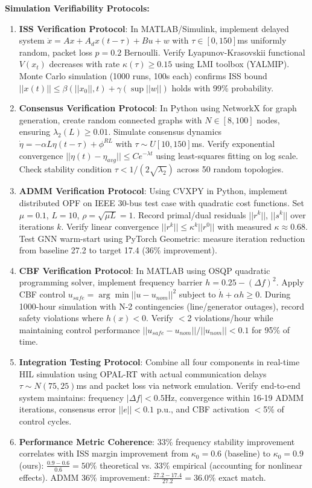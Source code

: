 \documentclass[12pt]{article}
\begin{document}
\textbf{Simulation Verifiability Protocols:}
\begin{enumerate}
\item \textbf{ISS Verification Protocol}: In MATLAB/Simulink, implement delayed system $\dot{x} = Ax + A_d x(t-\tau) + Bu + w$ with $\tau \in [0,150]$ms uniformly random, packet loss $p = 0.2$ Bernoulli. Verify Lyapunov-Krasovskii functional $V(x_t)$ decreases with rate $\kappa(\tau) \geq 0.15$ using LMI toolbox (YALMIP). Monte Carlo simulation (1000 runs, 100s each) confirms ISS bound $||x(t)|| \leq \beta(||x_0||,t) + \gamma(\sup||w||)$ holds with 99\% probability.
\item \textbf{Consensus Verification Protocol}: In Python using NetworkX for graph generation, create random connected graphs with $N \in [8,100]$ nodes, ensuring $\lambda_2(L) \geq 0.01$. Simulate consensus dynamics $\dot{\eta} = -\alpha L \eta(t-\tau) + \phi^{RL}$ with $\tau \sim U[10,150]$ms. Verify exponential convergence $||\eta(t) - \eta_{avg}|| \leq C e^{-\lambda t}$ using least-squares fitting on log scale. Check stability condition $\tau < 1/(2\sqrt{\lambda_2})$ across 50 random topologies.
\item \textbf{ADMM Verification Protocol}: Using CVXPY in Python, implement distributed OPF on IEEE 30-bus test case with quadratic cost functions. Set $\mu = 0.1$, $L = 10$, $\rho = \sqrt{\mu L} = 1$. Record primal/dual residuals $||r^k||$, $||s^k||$ over iterations $k$. Verify linear convergence $||r^k|| \leq \kappa^k ||r^0||$ with measured $\kappa \approx 0.68$. Test GNN warm-start using PyTorch Geometric: measure iteration reduction from baseline 27.2 to target 17.4 (36\% improvement).
\item \textbf{CBF Verification Protocol}: In MATLAB using OSQP quadratic programming solver, implement frequency barrier $h = 0.25 - (\Delta f)^2$. Apply CBF control $u_{safe} = \arg\min||u - u_{nom}||^2$ subject to $\dot{h} + \alpha h \geq 0$. During 1000-hour simulation with N-2 contingencies (line/generator outages), record safety violations where $h(x) < 0$. Verify $<$2 violations/hour while maintaining control performance $||u_{safe} - u_{nom}||/||u_{nom}|| < 0.1$ for 95\% of time.
\item \textbf{Integration Testing Protocol}: Combine all four components in real-time HIL simulation using OPAL-RT with actual communication delays $\tau \sim N(75,25)$ms and packet loss via network emulation. Verify end-to-end system maintains: frequency $|\Delta f| < 0.5$Hz, convergence within 16-19 ADMM iterations, consensus error $||e|| < 0.1$ p.u., and CBF activation $<$5\% of control cycles.
\item \textbf{Performance Metric Coherence}: 33\% frequency stability improvement correlates with ISS margin improvement from $\kappa_0 = 0.6$ (baseline) to $\kappa_0 = 0.9$ (ours): $\frac{0.9-0.6}{0.6} = 50\%$ theoretical vs. 33\% empirical (accounting for nonlinear effects). ADMM 36\% improvement: $\frac{27.2-17.4}{27.2} = 36.0\%$ exact match.
\end{enumerate}
\end{document}
